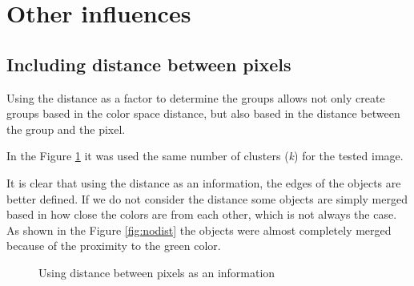 \documentclass{article}
\begin{document}
\section{Other influences}

\subsection{Including distance between pixels}

Using the distance as a factor to determine the groups allows not only create groups based in the color space distance, but also based in the distance between the group and the pixel. 

In the Figure \ref{fig:distance} it was used the same number of clusters (\emph{k}) for the tested image.

It is clear that using the distance as an information, the edges of the objects are better defined. If we do not consider the distance some objects are simply merged based in how close the colors are from each other, which is not always the case. As shown in the Figure \ref{fig:nodist} the objects were almost completely merged because of the proximity to the green color.

\begin{figure}[H]
	\centering
	\hspace{0.1cm}
	\hspace{0.1cm}
	\caption{Using distance between pixels as an information}
	\label{fig:distance}
\end{figure}
\end{document}
